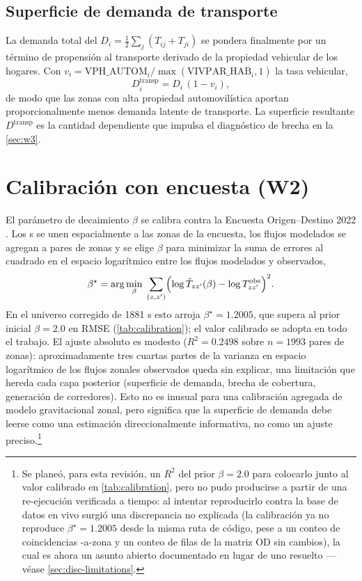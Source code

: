 \subsection{Superficie de demanda de transporte}
La demanda total del \ageb $D_i = \tfrac12\sum_j (T_{ij}+T_{ji})$ se pondera
finalmente por un término de propensión al transporte derivado de la propiedad
vehicular de los hogares. Con
$v_i = \mathrm{VPH\_AUTOM}_i / \max(\mathrm{VIVPAR\_HAB}_i, 1)$ la tasa vehicular,
\begin{equation}
  D^{\text{transp}}_i = D_i \,(1 - v_i),
  \label{eq:transit-demand}
\end{equation}
de modo que las zonas con alta propiedad automovilística aportan proporcionalmente
menos demanda latente de transporte. La superficie resultante $D^{\text{transp}}$ es
la cantidad dependiente que impulsa el diagnóstico de brecha en la \cref{sec:w3}.

\section{Calibración con encuesta (W2)}
\label{sec:w2}

El parámetro de decaimiento $\beta$ se calibra contra la Encuesta Origen--Destino
2022 \parencite{imeplan_eod2022}. Los \ageb{}s se unen espacialmente a las zonas de
la encuesta, los flujos modelados se agregan a pares de zonas y se elige $\beta$
para minimizar la suma de errores al cuadrado en el espacio logarítmico entre los
flujos modelados y observados,
\begin{equation}
  \beta^\star = \arg\min_{\beta}\;
  \sum_{(z,z')} \Bigl(\log \hat{T}_{zz'}(\beta) - \log T^{\text{obs}}_{zz'}\Bigr)^2 .
  \label{eq:calibration}
\end{equation}
En el universo corregido de \num{1881} \ageb{}s esto arroja
$\beta^\star = \num{1.2005}$, que supera al prior inicial $\beta = \num{2.0}$ en RMSE
(\cref{tab:calibration}); el valor calibrado se adopta en todo el trabajo. El ajuste
absoluto es modesto ($R^2 = \num{0.2498}$ sobre $n=\num{1993}$ pares de zonas):
aproximadamente tres cuartas partes de la varianza en espacio logarítmico de los flujos
zonales observados queda sin explicar, una limitación que hereda cada capa posterior
(superficie de demanda, brecha de cobertura, generación de corredores). Esto no es
inusual para una calibración agregada de modelo gravitacional zonal, pero significa que
la superficie de demanda debe leerse como una estimación direccionalmente informativa,
no como un ajuste preciso.\footnote{Se planeó, para esta revisión, un $R^2$ del prior
$\beta=2.0$ para colocarlo junto al valor calibrado en \cref{tab:calibration}, pero no
pudo producirse a partir de una re-ejecución verificada a tiempo: al intentar
reproducirlo contra la base de datos en vivo surgió una discrepancia no explicada (la
calibración ya no reproduce $\beta^\star=1.2005$ desde la misma ruta de código, pese a un
conteo de coincidencias \ageb-a-zona y un conteo de filas de la matriz OD sin cambios),
la cual es ahora un asunto abierto documentado en lugar de uno resuelto ---véase
\cref{sec:disc-limitations}.}

